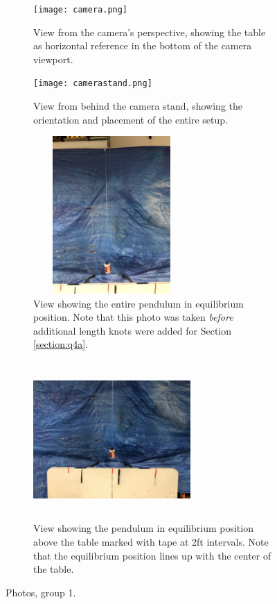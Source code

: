 \documentclass[12pt]{article}
\begin{document}
\begin{figure}[h]
    \centering
    \begin{subfigure}[b]{0.48\textwidth}
        \centering
        \texttt{[image: camera.png]}
        \caption{View from the camera's perspective, showing the table as horizontal reference in the bottom of the camera viewport.}
        \label{appendix:camera}
    \end{subfigure}
    \hfill
    \begin{subfigure}[b]{0.48\textwidth}
        \centering
        \texttt{[image: camerastand.png]}
        \caption{View from behind the camera stand, showing the orientation and placement of the entire setup.}
        \label{appendix:camerastand}
    \end{subfigure}
    \newline
    \begin{subfigure}[b]{0.48\textwidth}
        \centering
        \includegraphics[width=6cm,height=6cm,keepaspectratio,angle=270,origin=c]{setup.jpeg}
        \caption{View showing the entire pendulum in equilibrium position. Note that this photo was taken \emph{before} additional length knots were added for Section \ref{section:q4a}.}
        \label{appendix:setup}
    \end{subfigure}
    \hfill
    \begin{subfigure}[b]{0.48\textwidth}
        \centering
        \includegraphics[width=6cm,height=6cm,keepaspectratio]{table.jpeg}
        \caption{View showing the pendulum in equilibrium position above the table marked with tape at 2ft intervals. Note that the equilibrium position lines up with the center of the table.}
        \label{appendix:table}
    \end{subfigure}
    \hfill
    \caption{Photos, group 1.}
\end{figure}
\end{document}
